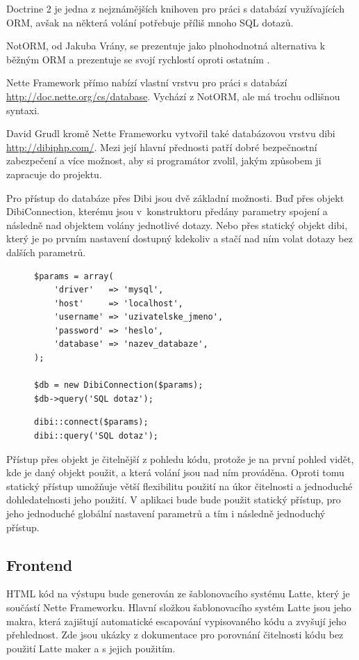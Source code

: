 \documentclass[thesis=B,czech]{FITthesis}[2011/06/14]
\begin{document}
Doctrine 2 je jedna z nejznámějších knihoven pro práci s databází využívajících ORM, avšak na některá volání potřebuje příliš mnoho SQL dotazů.

NotORM, od Jakuba Vrány, se prezentuje jako plnohodnotná alternativa k běžným ORM a prezentuje se svojí rychlostí oproti ostatním \cite{notorm}.

Nette Framework přímo nabízí vlastní vrstvu pro práci s databází \url{http://doc.nette.org/cs/database}. Vychází z NotORM, ale má trochu odlišnou syntaxi.

David Grudl kromě Nette Frameworku vytvořil také databázovou vrstvu dibi \url{http://dibiphp.com/}. Mezi její hlavní přednosti patří dobré bezpečnostní zabezpečení a více možnost, aby si programátor zvolil, jakým způsobem ji zapracuje do projektu.

Pro přístup do databáze přes Dibi jsou dvě základní možnosti. Buď přes objekt DibiConnection, kterému jsou v~konstruktoru předány parametry spojení a následně nad objektem volány jednotlivé dotazy. Nebo přes statický objekt dibi, který je po prvním nastavení dostupný kdekoliv a stačí nad ním volat dotazy bez dalších parametrů.

\begin{figure}[h]
\begin{lstlisting}[caption=použití Dibi s přístupem přes objekt, numbers=none]
$params = array(
    'driver'   => 'mysql',
    'host'     => 'localhost',
    'username' => 'uzivatelske_jmeno',
    'password' => 'heslo',
    'database' => 'nazev_databaze',
);

$db = new DibiConnection($params);
$db->query('SQL dotaz');
\end{lstlisting}

\begin{lstlisting}[caption=použití Dibi se statickým přístupem, numbers=none]
dibi::connect($params);
dibi::query('SQL dotaz');
\end{lstlisting}
\end{figure}

Přístup přes objekt je čitelnější z pohledu kódu, protože je na první pohled vidět, kde je daný objekt použit, a která volání jsou nad ním prováděna. Oproti tomu statický přístup umožňuje větší flexibilitu použití na úkor čitelnosti a jednoduché dohledatelnosti jeho použití. V aplikaci bude bude použit statický přístup, pro jeho jednoduché globální nastavení parametrů a tím i následně jednoduchý přístup.

\subsection{Frontend}
HTML kód na výstupu bude generován ze šablonovacího systému Latte, který je součástí Nette Frameworku. Hlavní složkou šablonovacího systém Latte jsou jeho makra, která zajištují automatické escapování vypisovaného kódu a zvyšují jeho přehlednost. Zde jsou ukázky z dokumentace \cite{latte} pro porovnání čitelnosti kódu bez použití Latte maker a s jejich použitím.
\end{document}
